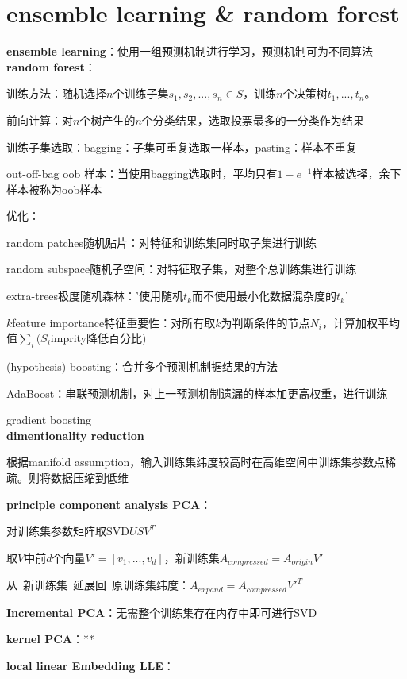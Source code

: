 \documentclass[UTF8]{ctexart}
\begin{document}
\section{ensemble learning \& random forest}
\noindent \textbf{ensemble learning}：使用一组预测机制进行学习，预测机制可为不同算法\\
\textbf{random forest}：

  训练方法：随机选择$n$个训练子集$s_1, s_2, ..., s_n \in S$，训练$n$个决策树$t_1, ..., t_n$。
  
  前向计算：对$n$个树产生的$n$个分类结果，选取投票最多的一分类作为结果
  
  训练子集选取：bagging：子集可重复选取一样本，pasting：样本不重复
  
  \quad out-off-bag oob 样本：当使用bagging选取时，平均只有$1-e^{-1}$样本被选择，余下样本被称为oob样本

  优化：

  \quad random patches随机贴片：对特征和训练集同时取子集进行训练
  
  \quad random subspace随机子空间：对特征取子集，对整个总训练集进行训练
  
  \quad extra-trees极度随机森林：'使用随机$t_k$而不使用最小化数据混杂度的$t_k$'
  
  \quad $k$feature importance特征重要性：对所有取$k$为判断条件的节点$N_i$，计算加权平均值$\sum_i(S_i$imprity降低百分比$)$
  
  \quad (hypothesis) boosting：合并多个预测机制据结果的方法
  
  \quad \quad AdaBoost：串联预测机制，对上一预测机制遗漏的样本加更高权重，进行训练

  \quad \quad gradient boosting\\
\textbf{dimentionality reduction}

  根据manifold assumption，输入训练集纬度较高时在高维空间中训练集参数点稀疏。则将数据压缩到低维

  \textbf{principle component analysis PCA}：

  \quad 对训练集参数矩阵取SVD$USV^T$

  \quad 取$V$中前$d$个向量$V' = [v_1, ..., v_d]$，新训练集$A_{compressed} = A_{origin}V'$
  
  \quad 从\ 新训练集\ 延展回\ 原训练集纬度：$A_{expand} = A_{compressed}V'^T$
  
  \textbf{Incremental PCA}：无需整个训练集存在内存中即可进行SVD
  
  \textbf{kernel PCA}：**
  
  \textbf{local linear Embedding LLE}：
  
\end{document}
